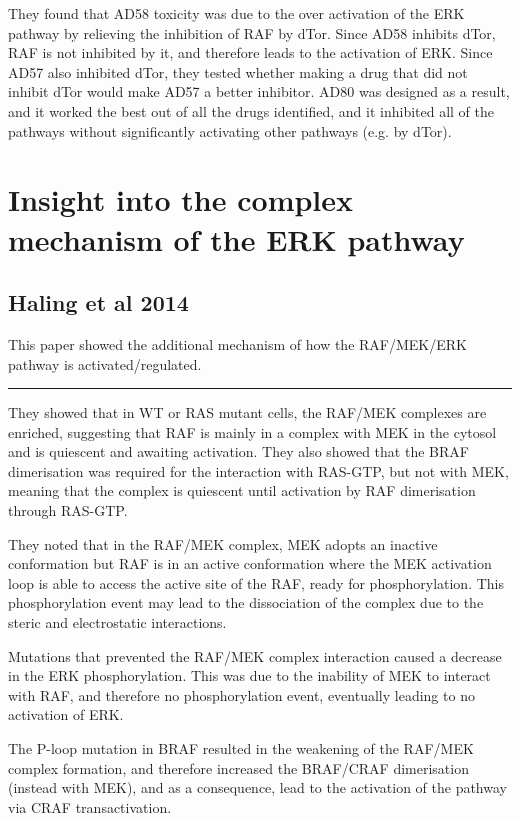\documentclass[a4paper,12pt]{article}
\begin{document}
They found that AD58 toxicity was due to the over activation of the ERK pathway by relieving the inhibition of RAF by dTor.
Since AD58 inhibits dTor, RAF is not inhibited by it, and therefore leads to the activation of ERK.
Since AD57 also inhibited dTor, they tested whether making a drug that did not inhibit dTor would make AD57 a better inhibitor.
AD80 was designed as a result, and it worked the best out of all the drugs identified, and it inhibited all of the pathways without significantly activating other pathways (e.g. by dTor).

\section*{Insight into the complex mechanism of the ERK pathway}

\subsection*{\normalsize{Haling et al 2014}}

This paper showed the additional mechanism of how the RAF/MEK/ERK pathway is activated/regulated.

\noindent\rule{\textwidth}{0.4pt}

They showed that in WT  or RAS mutant cells, the RAF/MEK complexes are enriched, suggesting that RAF is mainly in a complex with MEK in the cytosol and is quiescent and awaiting activation.
They also showed that the BRAF dimerisation was required for the interaction with RAS-GTP, but not with MEK, meaning that the complex is quiescent until activation by RAF dimerisation through RAS-GTP.

They noted that in the RAF/MEK complex, MEK adopts an inactive conformation but RAF is in an active conformation where the MEK activation loop is able to access the active site of the RAF, ready for phosphorylation.
This phosphorylation event may lead to the dissociation of the complex due to the steric and electrostatic interactions.

Mutations that prevented the RAF/MEK complex interaction caused a decrease in the ERK phosphorylation.
This was due to the inability of MEK to interact with RAF, and therefore no phosphorylation event, eventually leading to no activation of ERK.

The P-loop mutation in BRAF resulted in the weakening of the RAF/MEK complex formation, and therefore increased the BRAF/CRAF dimerisation (instead with MEK), and as a consequence, lead to the activation of the pathway via CRAF transactivation.
\end{document}
